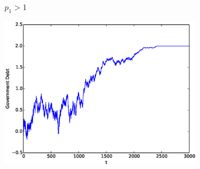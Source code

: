 \documentclass{beamer}
\begin{document}
 
 \begin{frame}

	\frametitle{$p_1 > 1$}
	\begin{center}
	\includegraphics[width=4in]{Images/port1.eps}
	\end{center}
\end{frame}
\end{document}
